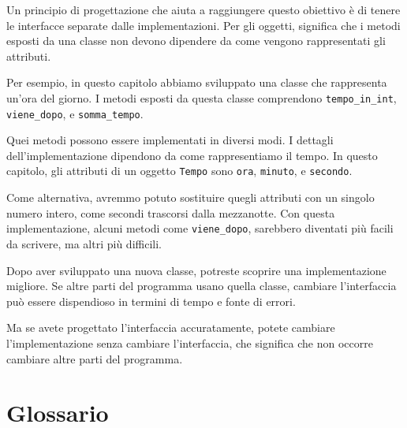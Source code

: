\documentclass[10pt]{book}
\begin{document}
Un principio di progettazione che aiuta a raggiungere questo obiettivo è di tenere le interfacce separate dalle implementazioni.
Per gli oggetti, significa che i metodi esposti da una classe non devono dipendere da come vengono rappresentati gli attributi.

Per esempio, in questo capitolo abbiamo sviluppato una classe che rappresenta un'ora del giorno. I metodi esposti da questa classe comprendono
\verb"tempo_in_int", \verb"viene_dopo", e \verb"somma_tempo".

Quei metodi possono essere implementati in diversi modi. I dettagli dell'implementazione dipendono da come rappresentiamo il tempo. In questo capitolo, gli attributi di un oggetto {\tt Tempo} sono {\tt ora}, {\tt minuto}, e {\tt secondo}.

Come alternativa, avremmo potuto sostituire quegli attributi con un singolo numero intero, come secondi trascorsi dalla mezzanotte. Con questa implementazione, alcuni metodi come \verb"viene_dopo", sarebbero diventati più facili da scrivere, ma altri più difficili.

Dopo aver sviluppato una nuova classe, potreste scoprire una implementazione migliore. Se altre parti del programma usano quella classe, cambiare l'interfaccia può essere dispendioso in termini di tempo e fonte di errori.  

Ma se avete progettato l'interfaccia accuratamente, potete cambiare l'implementazione senza cambiare l'interfaccia, che significa che non occorre cambiare altre parti del programma.


\section{Glossario}
\end{document}
